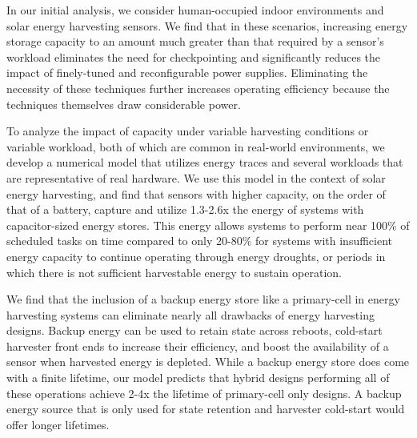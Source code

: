 In our initial analysis, we consider human-occupied indoor environments and
solar energy harvesting sensors.  We find that in these scenarios,
increasing energy storage capacity to an amount much greater than that required
by a sensor's workload eliminates the need for checkpointing and
significantly reduces the impact
of finely-tuned and reconfigurable power supplies. Eliminating the necessity
of these techniques further increases operating efficiency because the techniques
themselves draw considerable power.

To analyze the impact of capacity under variable harvesting
conditions or variable workload, both of which are common in real-world
environments, we develop a numerical model that
utilizes energy traces and several workloads that are representative
of real hardware.  We use this model in the context of solar energy harvesting,
and find that sensors with higher capacity, on the order of that of a battery,
capture and utilize 1.3-2.6x the energy of systems with capacitor-sized energy
stores. This energy allows systems to perform near 100\% of scheduled tasks on
time compared to only 20-80\% for systems with insufficient energy capacity to
continue operating through energy droughts, or periods in which there is not
sufficient harvestable energy to sustain operation.

We find that the inclusion of a backup energy store like a primary-cell
in energy harvesting systems can eliminate nearly all drawbacks
of energy harvesting designs.
Backup energy can be used to retain state across reboots, cold-start harvester
front ends to increase their efficiency, and boost the availability of a sensor
when harvested energy is depleted. While a backup energy
store does come with a finite lifetime, our model predicts that
hybrid designs performing all of these operations
achieve 2-4x the lifetime of primary-cell only designs. A backup energy source
that is only used for state retention and harvester cold-start would offer
longer lifetimes.

%

